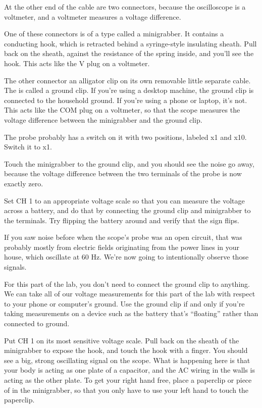 At the other end of the cable are two
connectors, because the oscilloscope is a voltmeter, and a voltmeter measures
a voltage difference.

One of these connectors is of a type called a minigrabber.  It
contains a conducting hook, which is retracted behind a syringe-style
insulating sheath. Pull back on the sheath, against the resistance of
the spring inside, and you'll see the hook.  This acts like the V plug
on a voltmeter.

The other connector an alligator clip on its own removable little separate cable. The is called a ground
clip. If you're using a desktop machine, the ground clip
is connected to the household ground. If you're using a phone or laptop, it's not.
This acts like the COM plug on a voltmeter, so that the scope measures the voltage
difference between the minigrabber and the ground clip.

The probe probably has a switch on it with two positions, labeled x1 and x10.
Switch it to x1.

Touch the minigrabber to the ground clip, and you should see the noise go
away, because the voltage difference between the two terminals of the probe is now exactly zero.

Set CH 1 to an appropriate voltage scale so that you can measure the voltage across
a battery, and do that by connecting the ground clip and minigrabber to the terminals. Try flipping the battery around and verify that the sign flips.


If you saw noise before when the scope's probe was an open circuit, that was probably
mostly from electric fields originating from the power lines in your house, which oscillate
at 60 Hz. We're now going to intentionally observe those signals.

For this part of the lab, you don't need to connect the ground clip to anything.
We can take all of our voltage measurements for this part of the lab
with respect to your phone or computer's ground. 
Use the ground clip if and only if you're taking measurements on a device such as the battery that's
``floating'' rather than connected to ground.

Put CH 1 on its most sensitive voltage scale. Pull back on the sheath of the minigrabber
to expose the hook, and touch the hook with a finger. You should see a big, strong
oscillating signal on the scope. What is happening here is that your body is acting
as one plate of a capacitor, and the AC wiring in the walls is acting as the other
plate.
To get your right hand free, place a  paperclip or piece of in the minigrabber, so that you
only have to use your left hand to touch the paperclip.

